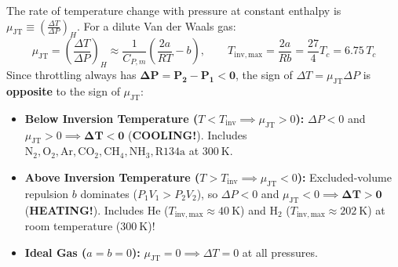 \begin{formulacard}
\begin{enumerate}
\begin{itemize}
    The rate of temperature change with pressure at constant enthalpy is $\mu_{\mathrm{JT}} \equiv \left(\frac{\Delta T}{\Delta P}\right)_H$. For a dilute Van der Waals gas:
    \begin{equation}\label{eq:07:mu-jt}
      \boxed{\mu_{\mathrm{JT}} = \left(\frac{\Delta T}{\Delta P}\right)_H \approx \frac{1}{C_{P,m}}\left(\frac{2a}{RT} - b\right)}, \qquad T_{\mathrm{inv,max}} = \frac{2a}{Rb} = \frac{27}{4}T_c = 6.75\,T_c
    \end{equation}
    Since throttling always has $\mathbf{\Delta P = P_2 - P_1 < 0}$, the sign of $\Delta T = \mu_{\mathrm{JT}}\Delta P$ is \textbf{opposite} to the sign of $\mu_{\mathrm{JT}}$:
    \begin{itemize}
      \item \textbf{Below Inversion Temperature ($T < T_{\mathrm{inv}} \implies \mu_{\mathrm{JT}} > 0$):} $\Delta P < 0$ and $\mu_{\mathrm{JT}} > 0 \implies \mathbf{\Delta T < 0}$ (\textbf{COOLING!}). Includes $\mathrm{N_2}, \mathrm{O_2}, \mathrm{Ar}, \mathrm{CO_2}, \mathrm{CH_4}, \mathrm{NH_3}, \mathrm{R134a}$ at $\SI{300}{\kelvin}$.
      \item \textbf{Above Inversion Temperature ($T > T_{\mathrm{inv}} \implies \mu_{\mathrm{JT}} < 0$):} Excluded-volume repulsion $b$ dominates ($P_1V_1 > P_2V_2$), so $\Delta P < 0$ and $\mu_{\mathrm{JT}} < 0 \implies \mathbf{\Delta T > 0}$ (\textbf{HEATING!}). Includes $\mathbf{\mathrm{He}}$ ($T_{\mathrm{inv,max}} \approx \SI{40}{\kelvin}$) and $\mathbf{\mathrm{H_2}}$ ($T_{\mathrm{inv,max}} \approx \SI{202}{\kelvin}$) at room temperature ($\SI{300}{\kelvin}$)!
      \item \textbf{Ideal Gas ($a = b = 0$):} $\mu_{\mathrm{JT}} = 0 \implies \Delta T = 0$ at all pressures.
    \end{itemize}
  \end{itemize}
\end{enumerate}
\end{formulacard}

